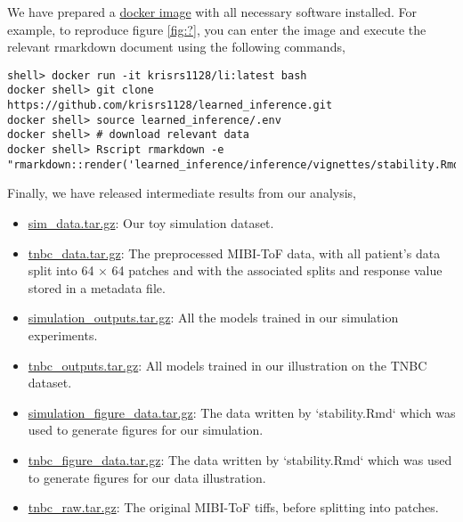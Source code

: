 We have prepared a \href{https://hub.docker.com/r/krisrs1128/li}{docker image}
with all necessary software installed. For example, to reproduce figure
\ref{fig:?}, you can enter the image and execute the relevant rmarkdown document
using the following commands,

\begin{verbatim}
shell> docker run -it krisrs1128/li:latest bash
docker shell> git clone https://github.com/krisrs1128/learned_inference.git
docker shell> source learned_inference/.env
docker shell> # download relevant data
docker shell> Rscript rmarkdown -e "rmarkdown::render('learned_inference/inference/vignettes/stability.Rmd')"
\end{verbatim}

Finally, we have released intermediate results from our analysis,

\begin{itemize}
\item
  \href{https://drive.google.com/file/d/1v_Ndux1Rmk2q1ul5Vv5srgI1JQ17Vx0n/view?usp=sharing}{sim\_data.tar.gz}:
  Our toy simulation dataset.
\item \href{https://drive.google.com/file/d/1KMG5yrty8UEPhrR0Y7hIZrtwWuP_y-cm/view?usp=sharing}{tnbc\_data.tar.gz}: The preprocessed MIBI-ToF data, with all
  patient's data split into 64 $\times$ 64 patches and with the associated
  splits and response value stored in a metadata file.
\item \href{https://drive.google.com/file/d/1QVmyqYQCe8C04rAyBQxXuZYuaiYleopx/view?usp=sharing}{simulation\_outputs.tar.gz}: All the models trained in our
  simulation experiments.
\item \href{https://drive.google.com/file/d/1DmzObBWCzVzDNZ1DxcUWgyIoZmC4H8gD/view?usp=sharing}{tnbc\_outputs.tar.gz}: All models trained in our illustration on
  the TNBC dataset.
\item \href{https://drive.google.com/file/d/1zJQOB2dSuy_1WYheJtUI8PZfu9PsyVGQ/view?usp=sharing}{simulation\_figure\_data.tar.gz}: The data written by
  `stability.Rmd` which was used to generate figures for our simulation.
\item \href{https://drive.google.com/file/d/1FaCrOysBlsNYgzul6iJiFcmgRFl2OaSE/view?usp=sharing}{tnbc\_figure\_data.tar.gz}: The data written by `stability.Rmd`
  which was used to generate figures for our data illustration.
\item \href{https://drive.google.com/file/d/1c-ZPs9RbzkY9FzUnCCVJc8syt5dpj-4Y/view?usp=sharing}{tnbc\_raw.tar.gz}:
  The original MIBI-ToF tiffs, before splitting into patches.
\end{itemize}

